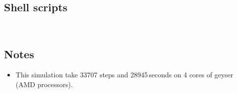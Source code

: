 \subsection{Shell scripts}
\label{psl-sh-files}
\topbar

\bottombar \\
\topbar

\bottombar

\subsection{Notes}
\begin{itemize}
\item This simulation take 33707 steps and 28945\,seconds on 4 cores of geyser (AMD processors).
\end{itemize}
